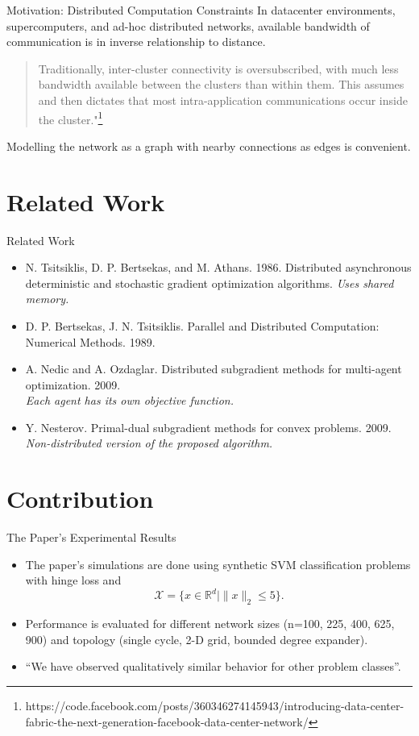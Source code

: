\documentclass{beamer}
\begin{document}
	\begin{frame}{Motivation: Distributed Computation Constraints}
		In datacenter environments, supercomputers, and ad-hoc
		distributed networks, available bandwidth of communication 
		is in inverse relationship to distance.
		\begin{quote}Traditionally, inter-cluster connectivity is oversubscribed, with much less bandwidth available between the clusters than within them. This assumes and then dictates that most intra-application communications occur inside the cluster."\footnote{https://code.facebook.com/posts/360346274145943/introducing-data-center-fabric-the-next-generation-facebook-data-center-network/}\end{quote}
		
		Modelling the network as a graph with nearby connections as
		edges is convenient.
	\end{frame}
	
	\section{Related Work}
	\begin{frame}{Related Work}
		\begin{itemize}
			\item N. Tsitsiklis, D. P. Bertsekas, and M. Athans. 1986.
Distributed asynchronous deterministic and stochastic
gradient optimization algorithms. \emph{Uses shared memory.}
			\item D. P. Bertsekas, J. N. Tsitsiklis. Parallel and Distributed Computation: Numerical Methods. 1989.
			\item A. Nedic and A. Ozdaglar. Distributed subgradient methods for multi-agent optimization. 2009.\\ 
			\emph{Each agent has its own objective function.}
			\item Y. Nesterov. Primal-dual subgradient methods for convex problems. 2009. \\
			\emph{Non-distributed version of the proposed algorithm.}
		\end{itemize}
	\end{frame}
	
	\section{Contribution}
	\begin{frame}{The Paper's Experimental Results}
		\begin{itemize}
			\item	The paper's simulations are done using
				synthetic SVM classification problems with hinge loss and
				\[\mathcal{X} = \{x \in \mathbb{R}^d \mid \|x\|_2 \leq 5\}.\]
			\item Performance is evaluated for different network sizes (n=100, 225, 400, 625, 900)
				and topology (single cycle, 2-D grid, bounded degree expander).
			\item ``We have observed qualitatively similar behavior for other problem classes''.
		\end{itemize}
	\end{frame}
	
\end{document}
